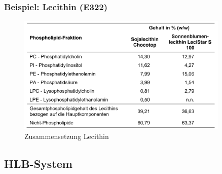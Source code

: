 \documentclass{beamer} %
\begin{document}
\begin{frame}
\frametitle{Beispiel: Lecithin (E322)}
\begin{figure}
\centering
\includegraphics[width = 0.9\textwidth]{ZusammensetzungLecithin.JPG}
\caption{Zusammensetzung Lecithin}
\end{figure}
\end{frame}


\subsection{HLB-System}
\end{document}

